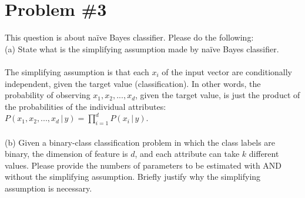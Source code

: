 \documentclass[12pt]{article}
\begin{document}
	
	\section*{Problem \#3}
	This question is about na\"ive Bayes classifier. Please do the following: \\
	(a) State what is the simplifying assumption made by na\"ive Bayes classifier.
	\paragraph{}
	The simplifying assumption is that each $x_i$ of the input vector are conditionally independent, given the target value (classification). In other words, the probability of observing $x_{1}, x_{2}, ..., x_{d}$, given the target value, is just the product of the probabilities of the individual attributes: $P(x_{1}, x_{2}, ..., x_{d} \, \vert \, y) = \prod_{i=1}^{d}P(x_{i} \, \vert \, y)$. \\ \\
	(b) Given a binary-class  classification  problem  in  which the  class  labels  are  binary,  the  dimension  of feature is $d$, and each attribute can take $k$ different values. Please provide the numbers of parameters to  be  estimated  with  AND  without  the  simplifying  assumption. Briefly  justify  why the  simplifying assumption is necessary.
\end{document}

